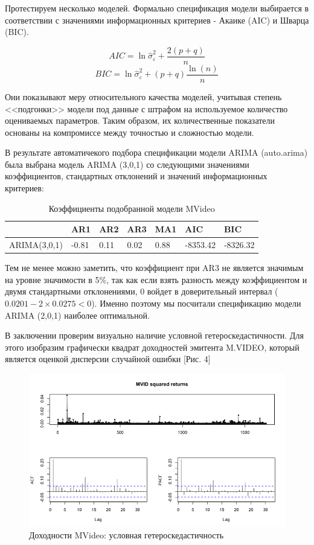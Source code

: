 \documentclass[a4paper,12pt,twoside]{article}
\begin{document}
Протестируем несколько моделей.
Формально спецификация модели выбирается в соответствии с значениями информационных критериев - Акаике (AIC) и Шварца (BIC).

$$ AIC = \ln \hat\sigma^2_{\varepsilon} + \frac{2(p+q)}{n}$$
$$ BIC = \ln \hat\sigma^2_{\varepsilon} + (p+q)\frac{\ln(n)}{n}$$

Они показывают меру относительного качества моделей, учитывая степень <<подгонки>> модели под данные с штрафом на используемое количество оцениваемых параметров. Таким образом, их количественные показатели основаны на компромиссе между точностью и сложностью модели.

В результате автоматичекого подбора спецификации модели ARIMA (auto.arima) была выбрана модель ARIMA (3,0,1) со следующими значениями коэффициентов, стандартных отклонений и значений информационных критериев:

\begin{table}[!h]
\centering
\begin{tabular}{lllllll}
  \hline
  & AR1 & AR2 & AR3 & MA1 & AIC & BIC\\
  \hline
  ARIMA(3,0,1) & -0.81 & 0.11 & 0.02 & 0.88 & -8353.42 & -8326.32\\
  \hline
\end{tabular}
\caption{Коэффициенты подобранной модели MVideo}
\end{table}

Тем не менее можно заметить, что коэффициент при AR3 не является значимым на уровне значимости в 5\%, так как если взять разность между коэффициентом и двумя стандартными отклонениями, 0 войдет в доверительный интервал ($0.0201- 2\times0.0275 < 0$). Именно поэтому мы посчитали спецификацию модели ARIMA (2,0,1) наиболее оптимальной.

В заключении проверим визуально наличие условной гетероскедастичности. Для этого изобразим графически квадрат доходностей эмитента M.VIDEO, который является оценкой дисперсии случайной ошибки [Рис. 4]

\begin{figure}[!h]
    \includegraphics[scale = 0.6]{mvideo_3.png}
    \caption{Доходности MVideo: условная гетероскедастичность}
    \label{fig:mvideo_03}
\end{figure}
\end{document}
